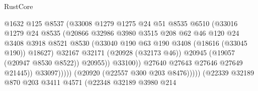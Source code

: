 \begin{lexlean}{RustCore}
\begin{coremodule}
                                      @1632
                                      @125
                                      @8537
                                      (@33008
                                        @1279
                                        @1275
                                        @24
                                        @51
                                        @8535
                                        @6510
                                        (@33016
                                          @1279
                                          @24
                                          @8535
                                          (@20866
                                            @32986
                                            @3980
                                            @3515
                                            @208
                                            @62
                                            @46
                                            @120
                                            @24
                                            @3408
                                            @3918
                                            @8521
                                            @8530
                                            (@33040
                                              @190
                                              @63
                                              @190
                                              @3408
                                              (@18616 (@33045 @190))
                                              @18627)
                                            @32167
                                            @32171
                                            (@20928 (@32173 @46))
                                            @20945
                                            (@19057 (@20947 @8530 @8522))
                                            @20955))
                                        @33100))
                                    @27640
                                    @27643
                                    @27646
                                    @27649
                                    @21445))
                                @33097)))))
                      (@20920 (@22557 @300 @203 @8476)))))
                (@22339
                  @32189
                  @870
                  @203
                  @3411
                  @4571
                  (@22348
                    @32189
                    @3980
                    @214

\end{coremodule}
\end{lexlean}
